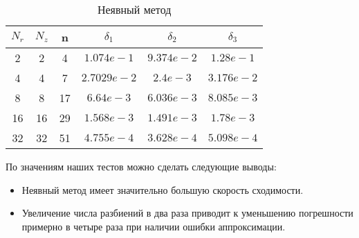 \begin{table}[H]
  \begin{center}
    \begin{tabular}{*{6}c}
      \toprule
      $ N_r $ & $ N_z $ & n & $ \delta_1 $ & $ \delta_2 $ & $ \delta_3 $ \\
      \midrule
      2 & 2 & 4 & $1.074e-1 $ & $9.374e-2 $ & $1.28e-1 $ \\
      4 & 4 & 7 & $2.7029e-2 $ & $2.4e-3 $ & $3.176e-2 $ \\
      8 & 8 & 17 & $6.64e-3 $ & $6.036e-3 $ & $8.085e-3 $ \\
      16 & 16 & 29 & $1.568e-3 $ & $1.491e-3 $ & $1.78e-3 $ \\
      32 & 32 & 51 & $4.755e-4 $ & $3.628e-4 $ & $5.098e-4 $ \\
      \bottomrule
    \end{tabular}
    \caption{Неявный метод}
  \end{center}
\end{table}

По значениям наших тестов можно сделать следующие выводы:
\begin{itemize}
  \item Неявный метод имеет значительно большую скорость сходимости.
  \item Увеличение числа разбиений в два раза приводит к уменьшению погрешности примерно в четыре раза при наличии ошибки аппроксимации.
\end{itemize}